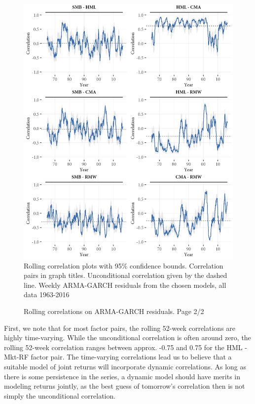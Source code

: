 \begin{figure}[htbp]
  \caption{Rolling correlations on ARMA-GARCH residuals. Page 2/2}
  \label{fig:rolling2}
  \centering
  \begin{minipage}{\textwidth}
  \includegraphics[scale=1]{graphics/rolling2.png}  
  \vspace{3mm}
  \footnotesize
  Rolling correlation plots with 95\% confidence bounds. Correlation pairs in graph titles. Unconditional correlation given by the dashed line. Weekly ARMA-GARCH residuals from the chosen models, all data 1963-2016
  \end{minipage}
\end{figure}
First, we note that for most factor pairs, the rolling 52-week correlations are highly time-varying. While the unconditional correlation is often around zero, the rolling 52-week correlation ranges between approx. -0.75 and 0.75 for the HML - Mkt-RF factor pair. The time-varying correlations lead us to believe that a suitable model of joint returns will incorporate dynamic correlations. As long as there is some persistence in the series, a dynamic model should have merits in modeling returns jointly, as the best guess of tomorrow's correlation then is not simply the unconditional correlation.

